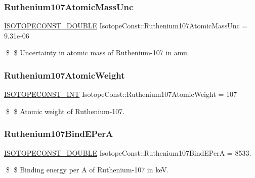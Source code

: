 \subsubsection{\texorpdfstring{Ruthenium107\+Atomic\+Mass\+Unc}{Ruthenium107AtomicMassUnc}}
{\footnotesize\ttfamily \mbox{\hyperlink{group___isotope_const-_macros_ga8f45a7272ce02c0b4c65c44636ed719a}{I\+S\+O\+T\+O\+P\+E\+C\+O\+N\+S\+T\+\_\+\+D\+O\+U\+B\+LE}} Isotope\+Const\+::\+Ruthenium107\+Atomic\+Mass\+Unc = 9.\+31e-\/06}

\$ \$ Uncertainty in atomic mass of Ruthenium-\/107 in amu. \mbox{\label{group___isotope_const-_ruthenium-_ru107_ga2ac95961b9f62c64b54e9eabe5171ddc}} 
\subsubsection{\texorpdfstring{Ruthenium107\+Atomic\+Weight}{Ruthenium107AtomicWeight}}
{\footnotesize\ttfamily \mbox{\hyperlink{group___isotope_const-_macros_ga5f18360b3e99483a35c32d789e62621c}{I\+S\+O\+T\+O\+P\+E\+C\+O\+N\+S\+T\+\_\+\+I\+NT}} Isotope\+Const\+::\+Ruthenium107\+Atomic\+Weight = 107}

\$ \$ Atomic weight of Ruthenium-\/107. \mbox{\label{group___isotope_const-_ruthenium-_ru107_gae2a78b089966929557515bf2d239aaf6}} 
\subsubsection{\texorpdfstring{Ruthenium107\+Bind\+E\+PerA}{Ruthenium107BindEPerA}}
{\footnotesize\ttfamily \mbox{\hyperlink{group___isotope_const-_macros_ga8f45a7272ce02c0b4c65c44636ed719a}{I\+S\+O\+T\+O\+P\+E\+C\+O\+N\+S\+T\+\_\+\+D\+O\+U\+B\+LE}} Isotope\+Const\+::\+Ruthenium107\+Bind\+E\+PerA = 8533.}

\$ \$ Binding energy per A of Ruthenium-\/107 in keV. \mbox{\label{group___isotope_const-_ruthenium-_ru107_ga294f910450b23920cbda575f7a917739}} 
